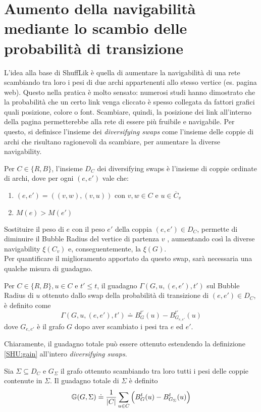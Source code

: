 \section{Aumento della navigabilità mediante lo scambio delle probabilità di transizione}
L'idea alla base di ShuffLik è quella di aumentare la navigabilità di una rete scambiando tra loro i pesi 
di due archi appartenenti allo stesso vertice (es. pagina web).
Questo nella pratica è molto sensato: numerosi studi hanno dimostrato che la probabilità che un certo link venga cliccato è spesso collegata da fattori grafici 
quali posizione, colore o font. Scambiare, quindi, la posizione dei link all'interno della pagina permetterebbe alla rete di essere più fruibile e navigabile.
Per questo, si definisce l'insieme dei \emph{diversifying swaps} come l'insieme delle coppie di archi che risultano ragionevoli da scambiare, per aumentare 
la diverse navigability.
\begin{definition}
    Per $C \in \{R,B\}$, l'insieme $D_C$ dei diversifying swaps è l'insieme di coppie ordinate di archi, dove per ogni $(e,e')$ vale che:
    \begin{enumerate}
        \item $(e,e')=((v,w),(v,u))$ con $v,w \in C$ e $u \in \overline{C}_v$
        \item $M(e) > M(e')$
    \end{enumerate} 
\end{definition}
Sostituire il peso di $e$ con il peso $e'$ della coppia $(e,e') \in D_C$, permette di diminuire il Bubble Radius del vertice di partenza $v$ ,
aumentando così la diverse navigability $\xi(C_v)$ e, conseguentemente, la $\xi(G)$.
\\
Per quantificare il miglioramento apportato da questo swap, sarà necessaria una qualche misura di guadagno.
\begin{definition}
    Per $C \in \{R,B\}, u\in C$ e $t' \le t$, il guadagno $\Gamma(G,u,(e,e'),t')$ sul Bubble Radius di $u$
    ottenuto dallo swap della probabilità di transizione di $(e,e')\in D_C$, è definito come
    \begin{equation}\label{SHU:gain}
        \Gamma(G,u,(e,e'),t')\doteq B_{G}^{t'}(u) - B_{G_{e,e'}}^{t'}(u)
    \end{equation}
    dove $G_{e,e'}$ è il grafo $G$ dopo aver scambiato i pesi tra $e$ ed $e'$.
\end{definition}
Chiaramente, il guadagno totale può essere ottenuto estendendo la definizione \ref{SHU:gain} all'intero \emph{diversifying swaps}.
\begin{definition}
    Sia $\Sigma \subseteq D_{C}$ e $G_{\Sigma}$ il grafo ottenuto scambiando tra loro tutti i pesi delle coppie contenute 
    in $\Sigma$. Il guadagno totale di $\Sigma$ è definito
    \begin{equation}
        \mathbb{G}(G,\Sigma)\doteq {1\over{|C|}}\sum_{u\in C}{\Big(B_{G}^{t}(u) - B_{G_{\Sigma}}^{t}(u) \Big)}
    \end{equation}
\end{definition}
